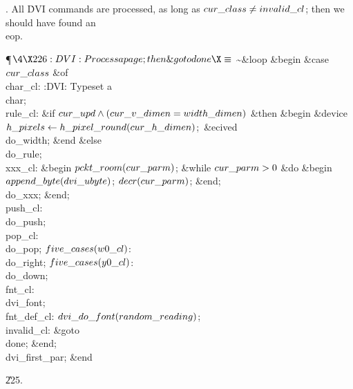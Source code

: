 . All \.{DVI} commands are processed, as long as $\\{cur\_class}\I%
\\{invalid\_cl}$;
then we should have found an \\{eop}.

\Y\P$\4\X226:DVI: Process a page; then \&{goto} \\{done}\X\S$\6
\~ \1\&{loop}\6
\&{begin} \&{case} $\\{cur\_class}$ \1\&{of}\6
\4\\{char\_cl}: :DVI: Typeset a \\{char}\X;\6
\4\\{rule\_cl}: \&{if} $\\{cur\_upd}\land(\\{cur\_v\_dimen}=\\{width\_dimen})$ %
\1\&{then}\6
\&{begin} \&{device} $\\{h\_pixels}\K\\{h\_pixel\_round}(\\{cur\_h%
\_dimen})$;\ \&{ecived}\6
\\{do\_width};\6
\&{end}\6
\4\&{else} \\{do\_rule};\2\6
\4\\{xxx\_cl}: \&{begin} $\\{pckt\_room}(\\{cur\_parm})$;\6
\&{while} $\\{cur\_parm}>0$ \1\&{do}\6
\&{begin} $\\{append\_byte}(\\{dvi\_ubyte})$;\5
$\\{decr}(\\{cur\_parm})$;\6
\&{end};\2\6
\\{do\_xxx};\6
\&{end};\6
\4\\{push\_cl}: \\{do\_push};\6
\4\\{pop\_cl}: \\{do\_pop};\6
\4$\\{five\_cases}(\\{w0\_cl})$: \\{do\_right};\6
\4$\\{five\_cases}(\\{y0\_cl})$: \\{do\_down};\6
\4\\{fnt\_cl}: \\{dvi\_font};\6
\4\\{fnt\_def\_cl}: $\\{dvi\_do\_font}(\\{random\_reading})$;\6
\4\\{invalid\_cl}: \&{goto} \\{done};\2\6
\&{end};\6
\\{dvi\_first\_par};\6
\&{end}\2\par
\U225.\fi


